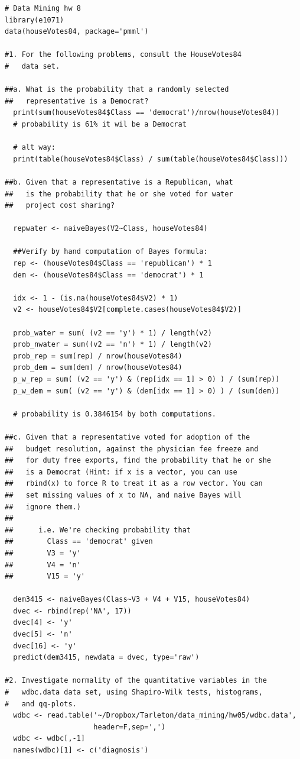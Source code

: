 \documentclass[11pt]{article}
\begin{document}
\begin{Verbatim}
# Data Mining hw 8
library(e1071)
data(houseVotes84, package='pmml')

#1. For the following problems, consult the HouseVotes84 
#   data set. 

##a. What is the probability that a randomly selected 
##   representative is a Democrat? 
  print(sum(houseVotes84$Class == 'democrat')/nrow(houseVotes84))
  # probability is 61% it wil be a Democrat

  # alt way: 
  print(table(houseVotes84$Class) / sum(table(houseVotes84$Class)))

##b. Given that a representative is a Republican, what 
##   is the probability that he or she voted for water 
##   project cost sharing? 

  repwater <- naiveBayes(V2~Class, houseVotes84)

  ##Verify by hand computation of Bayes formula: 
  rep <- (houseVotes84$Class == 'republican') * 1
  dem <- (houseVotes84$Class == 'democrat') * 1

  idx <- 1 - (is.na(houseVotes84$V2) * 1) 
  v2 <- houseVotes84$V2[complete.cases(houseVotes84$V2)]

  prob_water = sum( (v2 == 'y') * 1) / length(v2)
  prob_nwater = sum((v2 == 'n') * 1) / length(v2)
  prob_rep = sum(rep) / nrow(houseVotes84)
  prob_dem = sum(dem) / nrow(houseVotes84)
  p_w_rep = sum( (v2 == 'y') & (rep[idx == 1] > 0) ) / (sum(rep))
  p_w_dem = sum( (v2 == 'y') & (dem[idx == 1] > 0) ) / (sum(dem))

  # probability is 0.3846154 by both computations.

##c. Given that a representative voted for adoption of the 
##   budget resolution, against the physician fee freeze and 
##   for duty free exports, find the probability that he or she 
##   is a Democrat (Hint: if x is a vector, you can use 
##   rbind(x) to force R to treat it as a row vector. You can 
##   set missing values of x to NA, and naive Bayes will 
##   ignore them.)
##
##      i.e. We're checking probability that
##        Class == 'democrat' given 
##        V3 = 'y'
##        V4 = 'n'
##        V15 = 'y'

  dem3415 <- naiveBayes(Class~V3 + V4 + V15, houseVotes84)
  dvec <- rbind(rep('NA', 17))
  dvec[4] <- 'y'
  dvec[5] <- 'n'
  dvec[16] <- 'y'
  predict(dem3415, newdata = dvec, type='raw')

#2. Investigate normality of the quantitative variables in the 
#   wdbc.data data set, using Shapiro-Wilk tests, histograms, 
#   and qq-plots. 
  wdbc <- read.table('~/Dropbox/Tarleton/data_mining/hw05/wdbc.data',
                     header=F,sep=',')
  wdbc <- wdbc[,-1]
  names(wdbc)[1] <- c('diagnosis')


\end{Verbatim}
\end{document}
